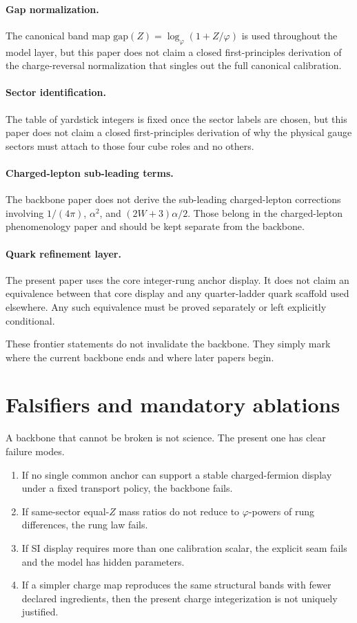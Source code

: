 \documentclass[11pt]{article}
\newcommand{\phig}{\varphi}
\begin{document}
\paragraph{Gap normalization.} The canonical band map \(\mathrm{gap}(Z)=\log_{\phig}(1+Z/\phig)\) is used throughout the model layer, but this paper does not claim a closed first-principles derivation of the charge-reversal normalization that singles out the full canonical calibration.

\paragraph{Sector identification.} The table of yardstick integers is fixed once the sector labels are chosen, but this paper does not claim a closed first-principles derivation of why the physical gauge sectors must attach to those four cube roles and no others.

\paragraph{Charged-lepton sub-leading terms.} The backbone paper does not derive the sub-leading charged-lepton corrections involving \(1/(4\pi)\), \(\alpha^2\), and \((2W+3)\alpha/2\). Those belong in the charged-lepton phenomenology paper and should be kept separate from the backbone.

\paragraph{Quark refinement layer.} The present paper uses the core integer-rung anchor display. It does not claim an equivalence between that core display and any quarter-ladder quark scaffold used elsewhere. Any such equivalence must be proved separately or left explicitly conditional.

These frontier statements do not invalidate the backbone. They simply mark where the current backbone ends and where later papers begin.

\section{Falsifiers and mandatory ablations}

A backbone that cannot be broken is not science. The present one has clear failure modes.

\begin{enumerate}
  \item If no single common anchor can support a stable charged-fermion display under a fixed transport policy, the backbone fails.
  \item If same-sector equal-\(Z\) mass ratios do not reduce to \(\phig\)-powers of rung differences, the rung law fails.
  \item If SI display requires more than one calibration scalar, the explicit seam fails and the model has hidden parameters.
  \item If a simpler charge map reproduces the same structural bands with fewer declared ingredients, then the present charge integerization is not uniquely justified.
\end{enumerate}
\end{document}
